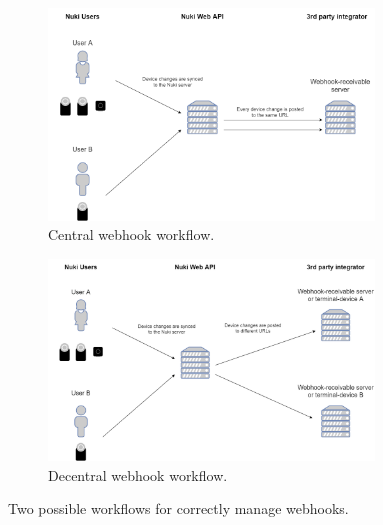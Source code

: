 \begin{figure}[H]
     \centering
     \captionsetup[subfigure]{justification=centering}
     \begin{subfigure}[b]{0.8\textwidth}
         \centering
         \includegraphics[width=0.95\textwidth]{figures/centralwebhook.png}
         \caption{Central webhook workflow.}
         \label{fig:centralwebhook}
     \end{subfigure}
     \par\bigskip
     \begin{subfigure}[b]{0.8\textwidth}
         \centering
         \includegraphics[width=0.95\textwidth]{figures/decentralwebhook.png}
         \caption{Decentral webhook workflow.}
         \label{fig:decentralwebhook}
     \end{subfigure}
    \caption{Two possible workflows for correctly manage webhooks.}
    \label{fig:nukiwebhooks}
\end{figure}

